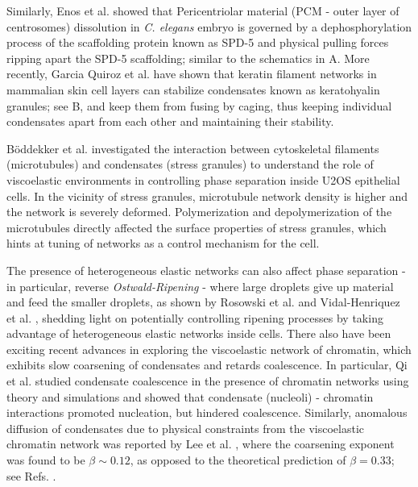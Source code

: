 Similarly, Enos et al. \cite{Enos2018} showed that Pericentriolar material (PCM - outer layer of centrosomes) dissolution in \textit{C. elegans} embryo is governed by a dephosphorylation process of the scaffolding protein known as SPD-5 and physical pulling forces ripping apart the SPD-5 scaffolding; similar to the schematics in A.  More recently, Garcia Quiroz et al. \cite{Quiroz2020} have shown that keratin filament networks in mammalian skin cell layers can stabilize condensates known as keratohyalin granules; see B, and keep them from fusing by caging, thus keeping individual condensates apart from each other and maintaining their stability.

B\"{o}ddekker et al. \cite{Boeddeker2022} investigated the interaction between cytoskeletal filaments (microtubules) and condensates (stress granules) to understand the role of viscoelastic environments in controlling phase separation inside U2OS epithelial cells.
In the vicinity of stress granules, microtubule network density is higher and the network is severely deformed.
Polymerization and depolymerization of the microtubules directly affected the surface properties of stress granules, which hints at tuning of networks as a control mechanism for the cell.

The presence of heterogeneous elastic networks can also affect phase separation - in particular, reverse \textit{Ostwald-Ripening} - where large droplets give up material and feed the smaller droplets, as shown by Rosowski et al. \cite{Rosowski2020,D0SM00628A} and Vidal-Henriquez et al. \cite{VidalHenriquez2021}, shedding light on potentially controlling ripening processes by taking advantage of heterogeneous elastic networks inside cells.
There also have been exciting recent advances in exploring the viscoelastic network of chromatin, which exhibits slow coarsening of condensates and retards coalescence.
In particular, Qi et al. \cite{Qi2021} studied condensate coalescence in the presence of chromatin networks using theory and simulations and showed that condensate (nucleoli) - chromatin interactions promoted nucleation, but hindered coalescence.
Similarly, anomalous diffusion of condensates due to physical constraints from the viscoelastic chromatin network was reported by Lee et al. \cite{Lee2021}, where the coarsening exponent was found to be $\beta \sim 0.12$, as opposed to the theoretical prediction of $\beta = 0.33$; see Refs. \cite{Review2019,Weber2017}.

